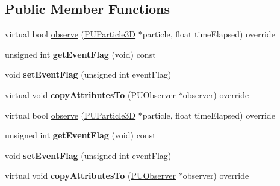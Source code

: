 \subsection*{Public Member Functions}
\begin{DoxyCompactItemize}
\item 
virtual bool \hyperlink{classPUOnEventFlagObserver_acf9852b52ba0a7fcf2ebaf35f3dd64ee}{observe} (\hyperlink{structPUParticle3D}{P\+U\+Particle3D} $\ast$particle, float time\+Elapsed) override
\item 
\mbox{\label{classPUOnEventFlagObserver_a94e50b4ca7a8408816b213667b3f7c77}} 
unsigned int {\bfseries get\+Event\+Flag} (void) const
\item 
\mbox{\label{classPUOnEventFlagObserver_a2997811e2ade0933832f11784185d564}} 
void {\bfseries set\+Event\+Flag} (unsigned int event\+Flag)
\item 
\mbox{\label{classPUOnEventFlagObserver_ae52134eade985cff32223ab9ce945f0b}} 
virtual void {\bfseries copy\+Attributes\+To} (\hyperlink{classPUObserver}{P\+U\+Observer} $\ast$observer) override
\item 
virtual bool \hyperlink{classPUOnEventFlagObserver_a686b31262aca58e1fd6ae83cdafa809b}{observe} (\hyperlink{structPUParticle3D}{P\+U\+Particle3D} $\ast$particle, float time\+Elapsed) override
\item 
\mbox{\label{classPUOnEventFlagObserver_a94e50b4ca7a8408816b213667b3f7c77}} 
unsigned int {\bfseries get\+Event\+Flag} (void) const
\item 
\mbox{\label{classPUOnEventFlagObserver_a2997811e2ade0933832f11784185d564}} 
void {\bfseries set\+Event\+Flag} (unsigned int event\+Flag)
\item 
\mbox{\label{classPUOnEventFlagObserver_a9b44c2b396f6aabbe7afbbb1fd9635d4}} 
virtual void {\bfseries copy\+Attributes\+To} (\hyperlink{classPUObserver}{P\+U\+Observer} $\ast$observer) override
\end{DoxyCompactItemize}
